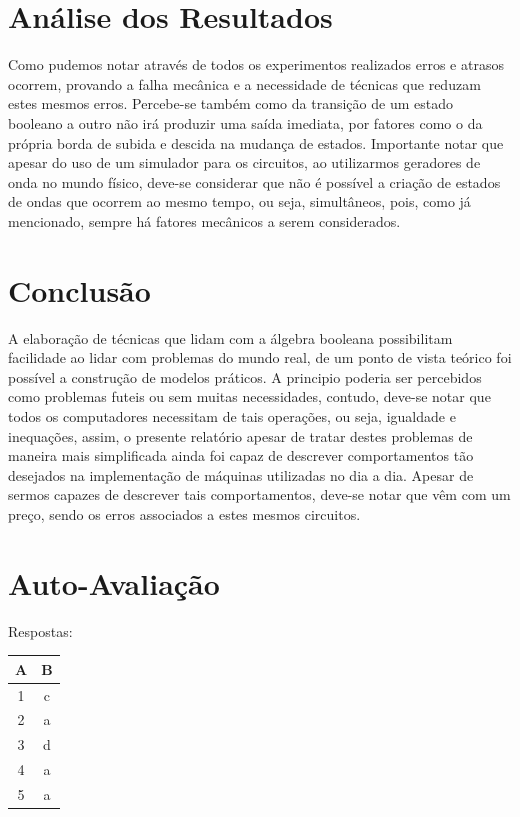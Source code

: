 \documentclass[12pt]{article}
\begin{document}
\section{Análise dos Resultados}
\label{sec:Resultados}

Como pudemos notar através de todos os experimentos realizados erros e atrasos
ocorrem, provando a falha mecânica e a necessidade de técnicas que reduzam estes
mesmos erros. Percebe-se também como da transição de um estado booleano a outro
não irá produzir uma saída imediata, por fatores como o da própria borda de
subida e descida na mudança de estados. Importante notar que apesar do uso de um
simulador para os circuitos, ao utilizarmos geradores de onda no mundo físico,
deve-se considerar que não é possível a criação de estados de ondas que ocorrem
ao mesmo tempo, ou seja, simultâneos, pois, como já mencionado, sempre há
fatores mecânicos a serem considerados.

\section{Conclusão}
\label{sec:Conclusao}

A elaboração de técnicas que lidam com a álgebra booleana possibilitam
facilidade ao lidar com problemas do mundo real, de um ponto de vista teórico
foi possível a construção de modelos práticos. A principio poderia ser
percebidos como problemas futeis ou sem muitas necessidades, contudo, deve-se
notar que todos os computadores necessitam de tais operações, ou seja, igualdade
e inequações, assim, o presente relatório apesar de tratar destes problemas de
maneira mais simplificada ainda foi capaz de descrever comportamentos tão
desejados na implementação de máquinas utilizadas no dia a dia. Apesar de sermos
capazes de descrever tais comportamentos, deve-se notar que vêm com um preço,
sendo os erros associados a estes mesmos circuitos.

\nocite{*}



\newpage
\section*{Auto-Avaliação}

Respostas:
\begin{table}[H]
     \begin{tabular}{|c|c|} \hline
     \textbf{A} & \textbf{B}\\
     \hline
     1 & c \\ \hline
     2 & a \\ \hline
     3 & d \\ \hline
     4 & a \\ \hline
     5 & a \\ \hline
     \end{tabular}
\end{table}
\end{document}

